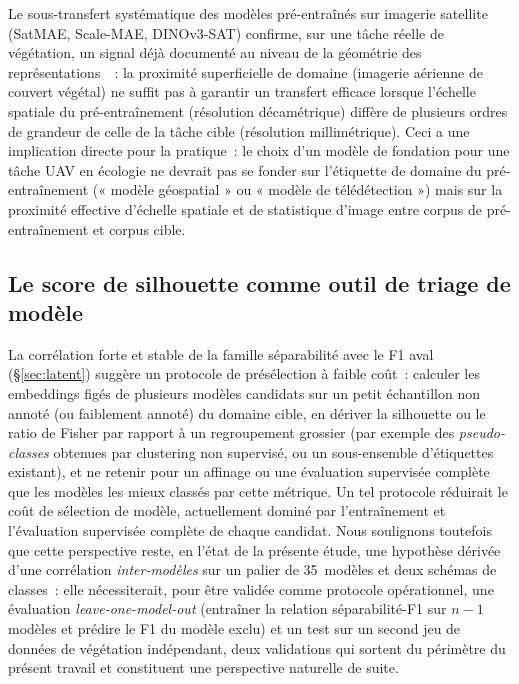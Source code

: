 \documentclass[11pt,a4paper]{article}
\begin{document}
Le sous-transfert systématique des modèles pré-entraînés sur imagerie satellite (SatMAE, Scale-MAE, DINOv3-SAT) confirme, sur une tâche réelle de végétation, un signal déjà documenté au niveau de la géométrie des représentations~\autocite{sosa2024effective}~: la proximité superficielle de domaine (imagerie aérienne de couvert végétal) ne suffit pas à garantir un transfert efficace lorsque l'échelle spatiale du pré-entraînement (résolution décamétrique) diffère de plusieurs ordres de grandeur de celle de la tâche cible (résolution millimétrique). Ceci a une implication directe pour la pratique~: le choix d'un modèle de fondation pour une tâche UAV en écologie ne devrait pas se fonder sur l'étiquette de domaine du pré-entraînement (« modèle géospatial » ou « modèle de télédétection ») mais sur la proximité effective d'échelle spatiale et de statistique d'image entre corpus de pré-entraînement et corpus cible.

\subsection{Le score de silhouette comme outil de triage de modèle}

La corrélation forte et stable de la famille séparabilité avec le F1 aval (\S\ref{sec:latent}) suggère un protocole de présélection à faible coût~: calculer les embeddings figés de plusieurs modèles candidats sur un petit échantillon non annoté (ou faiblement annoté) du domaine cible, en dériver la silhouette ou le ratio de Fisher par rapport à un regroupement grossier (par exemple des \emph{pseudo-classes} obtenues par clustering non supervisé, ou un sous-ensemble d'étiquettes existant), et ne retenir pour un affinage ou une évaluation supervisée complète que les modèles les mieux classés par cette métrique. Un tel protocole réduirait le coût de sélection de modèle, actuellement dominé par l'entraînement et l'évaluation supervisée complète de chaque candidat. Nous soulignons toutefois que cette perspective reste, en l'état de la présente étude, une hypothèse dérivée d'une corrélation \emph{inter-modèles} sur un palier de 35~modèles et deux schémas de classes~: elle nécessiterait, pour être validée comme protocole opérationnel, une évaluation \emph{leave-one-model-out} (entraîner la relation séparabilité-F1 sur $n-1$ modèles et prédire le F1 du modèle exclu) et un test sur un second jeu de données de végétation indépendant, deux validations qui sortent du périmètre du présent travail et constituent une perspective naturelle de suite.
\end{document}
